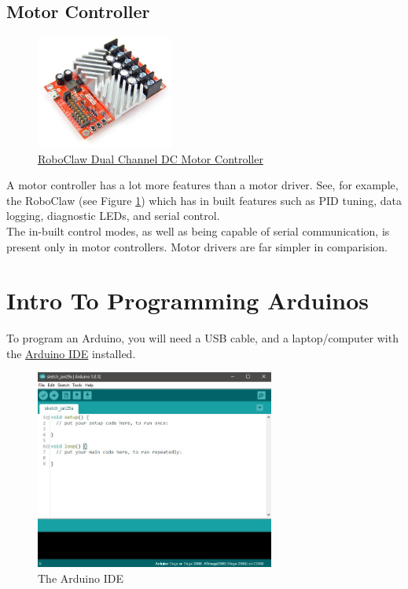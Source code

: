 \documentclass[a4paper,12pt]{article}
\begin{document}
\subsection{Motor Controller}


\begin{figure}
    \includegraphics[width=0.4\textwidth]{roboclaw.jpg}
    \caption{\href{https://www.robotshop.com/media/files/content/b/bat/pdf/roboclaw_datasheet_2x30a-2.pdf}{RoboClaw Dual Channel DC Motor Controller}}
    \label{fig:roboclaw}
\end{figure}

A motor controller has a lot more features than a motor driver. See, for example, the RoboClaw (see Figure \ref{fig:roboclaw}) which has in built features such as PID tuning, data logging, diagnostic LEDs, and serial control. \\


The in-built control modes, as well as being capable of serial communication, is present only in motor controllers. Motor drivers are far simpler in comparision. \\

\pagebreak
\section{Intro To Programming Arduinos}

To program an Arduino, you will need a USB cable, and a laptop/computer with the \href{https://www.arduino.cc/en/software}{Arduino IDE} installed. 



\begin{figure}[h]
    \centering
    \includegraphics[width=0.7\textwidth]{arduino_ide.jpg}
    \caption{The Arduino IDE}
\end{figure}
\end{document}
